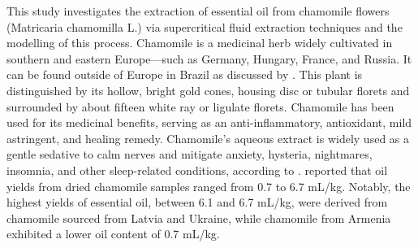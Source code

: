 \documentclass[../Article_Model_Parameters.tex]{subfiles}
\begin{document}
	
	This study investigates the extraction of essential oil from chamomile flowers (Matricaria chamomilla L.) via supercritical fluid extraction techniques and the modelling of this process. Chamomile is a medicinal herb widely cultivated in southern and eastern Europe—such as Germany, Hungary, France, and Russia. It can be found outside of Europe in Brazil as discussed by \citet{Singh2011}. This plant is distinguished by its hollow, bright gold cones, housing disc or tubular florets and surrounded by about fifteen white ray or ligulate florets. Chamomile has been used for its medicinal benefits, serving as an anti-inflammatory, antioxidant, mild astringent, and healing remedy. Chamomile's aqueous extract is widely used as a gentle sedative to calm nerves and mitigate anxiety, hysteria, nightmares, insomnia, and other sleep-related conditions, according to \citet{Srivastava2009}. \citet{Orav2010} reported that oil yields from dried chamomile samples ranged from 0.7 to 6.7 mL/kg. Notably, the highest yields of essential oil, between 6.1 and 6.7 mL/kg, were derived from chamomile sourced from Latvia and Ukraine, while chamomile from Armenia exhibited a lower oil content of 0.7 mL/kg.
	
	
	
\end{document}
